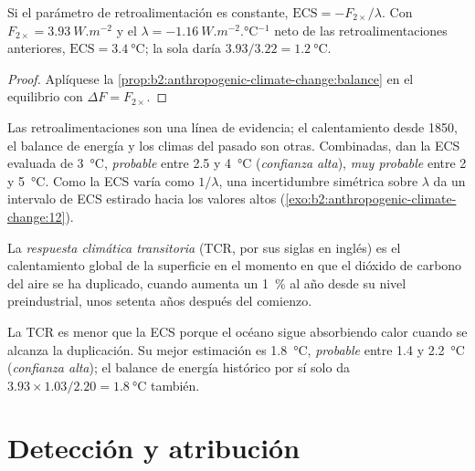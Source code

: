 \begin{proposition}\label{prop:b2:anthropogenic-climate-change:ecs}
Si el parámetro de retroalimentación es constante, $\text{ECS} = -F_{2\times}/\lambda$. Con $F_{2\times} =
\qty{3.93}{W.m^{-2}}$ y el $\lambda = \qty{-1.16}{W.m^{-2}.\celsius^{-1}}$ neto de las retroalimentaciones
anteriores, $\text{ECS} = \qty{3.4}{\celsius}$; la  sola daría $3.93/3.22 =
\qty{1.2}{\celsius}$.
\end{proposition}
\begin{proof}
Aplíquese la \cref{prop:b2:anthropogenic-climate-change:balance} en el equilibrio con $\Delta F =
F_{2\times}$.
\end{proof}

Las retroalimentaciones son una línea de evidencia; el calentamiento desde 1850, el balance de energía y los climas
del pasado son otras. Combinadas, dan la ECS evaluada de \qty{3}{\celsius}, \emph{probable} entre
2.5 y \qty{4}{\celsius} (\emph{confianza alta}), \emph{muy probable} entre 2 y \qty{5}{\celsius}.
Como la ECS varía como $1/\lambda$, una incertidumbre simétrica sobre $\lambda$ da un intervalo
de ECS estirado hacia los valores altos (\cref{exo:b2:anthropogenic-climate-change:12}).

\begin{definition}\label{def:b2:anthropogenic-climate-change:tcr}
La \emph{respuesta climática transitoria} (TCR, por sus siglas en inglés) es el calentamiento global de la superficie
en el momento en que el dióxido de carbono del aire se ha duplicado, cuando aumenta un \qty{1}{\percent}
al año desde su nivel preindustrial, unos setenta años después del comienzo.
\end{definition}

La TCR es menor que la ECS porque el océano sigue absorbiendo calor cuando se alcanza la duplicación.
Su mejor estimación es \qty{1.8}{\celsius}, \emph{probable} entre 1.4 y \qty{2.2}{\celsius}
(\emph{confianza alta}); el balance de energía histórico por sí solo da $3.93 \times 1.03/2.20 =
\qty{1.8}{\celsius}$ también.

\section{Detección y atribución}\label{sec:b2:anthropogenic-climate-change:attribution}

